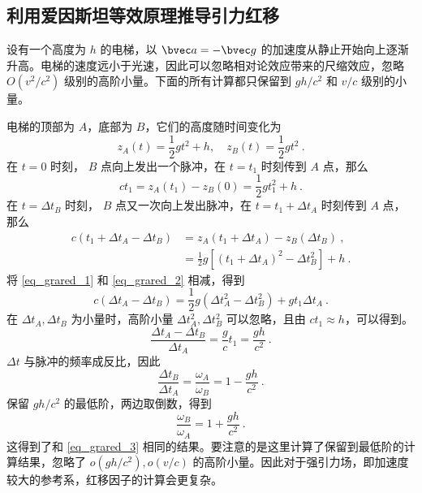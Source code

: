 \subsection{利用爱因斯坦等效原理推导引力红移}
设有一个高度为 $h$ 的电梯，以 $\bvec a=-\bvec g$ 的加速度从静止开始向上逐渐升高。电梯的速度远小于光速，因此可以忽略相对论效应带来的尺缩效应，忽略 $O(v^2/c^2)$ 级别的高阶小量。下面的所有计算都只保留到 $gh/c^2$ 和 $v/c$ 级别的小量。

电梯的顶部为 $A$，底部为 $B$，它们的高度随时间变化为
\begin{equation}
z_A(t)=\frac{1}{2}gt^2+h,\quad z_B(t)=\frac{1}{2}gt^2~.
\end{equation}
在 $t=0$ 时刻， $B$ 点向上发出一个脉冲，在 $t=t_1$ 时刻传到 $A$ 点，那么
\begin{equation}\label{eq_grared_1}
ct_1 = z_A(t_1)-z_B(0)=\frac{1}{2}g t_1^2+h ~.
\end{equation}
在 $t=\Delta t_B$ 时刻， $B$ 点又一次向上发出脉冲，在 $t=t_1+\Delta t_A$ 时刻传到 $A$ 点，那么
\begin{equation}\label{eq_grared_2}
\begin{aligned}
c (t_1+\Delta t_A - \Delta t_B) &= z_A(t_1+\Delta t_A) - z_B(\Delta t_B)~,
\\
&=\frac{1}{2} g[(t_1+\Delta t_A)^2-\Delta t_B^2] +h
~.
\end{aligned}
\end{equation}
将 \autoref{eq_grared_1} 和 \autoref{eq_grared_2} 相减，得到
\begin{equation}
c(\Delta t_A-\Delta t_B)=\frac{1}{2}g(\Delta t_A^2-\Delta t_B^2)+gt_1 \Delta t_A~.
\end{equation}
在 $\Delta t_A,\Delta t_B$ 为小量时，高阶小量 $\Delta t_A^2,\Delta t_B^2$ 可以忽略，且由  $c t_1\approx h$，可以得到。
\begin{equation}
\frac{\Delta t_A-\Delta t_B}{\Delta t_A} = \frac{g}{c}t_1=\frac{gh}{c^2}~.
\end{equation}
$\Delta t$ 与脉冲的频率成反比，因此
\begin{equation}
\frac{\Delta t_B}{\Delta t_A} = \frac{\omega_A}{\omega_B} = 1-\frac{gh}{c^2}~.
\end{equation}
保留 $gh/c^2$ 的最低阶，两边取倒数，得到
\begin{equation}
\frac{\omega_B}{\omega_A} = 1+\frac{gh}{c^2}~.
\end{equation}
这得到了和 \autoref{eq_grared_3} 相同的结果。要注意的是这里计算了保留到最低阶的计算结果，忽略了 $o(gh/c^2),o(v/c)$ 的高阶小量。因此对于强引力场，即加速度较大的参考系，红移因子的计算会更复杂。